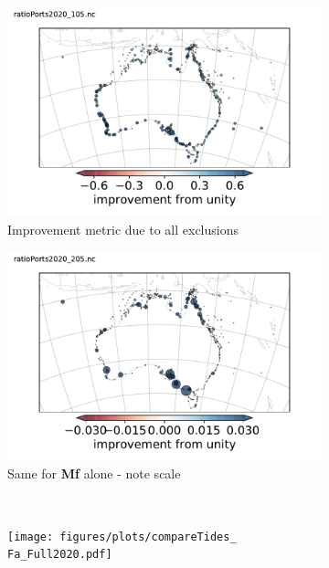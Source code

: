 \begin{figure}[!hbt] \centering
    \begin{subfigure}[b]{\figwidthHalf}
        \includegraphics[trim={0 0 0 1cm},clip,width=\textwidth]{figures/maps/otpsPortCompare_Improve2020_105_diffRmse.pdf}
        \caption{Improvement metric due to all exclusions}
    \end{subfigure}
    \begin{subfigure}[b]{\figwidthHalf}
        \includegraphics[trim={0 0 0 1cm},clip,width=\textwidth]{figures/maps/otpsPortCompare_Improve2020_205_diffRmse.pdf}
        \caption{Same for \textbf{Mf} alone - note scale}
    \end{subfigure}
    \\
    \begin{subfigure}[b]{\figwidthThird}
        \texttt{[image: figures/plots/compareTides\_\\Fa\_Full2020.pdf]} 

\end{subfigure}
\end{figure}
